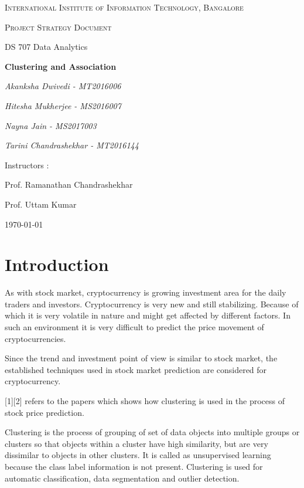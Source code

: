 \documentclass{article}
\begin{document}
\begin{titlepage}
	\centering
	{\scshape\LARGE International Institute of Information Technology, Bangalore \par}
	\vspace{1cm}
	{\scshape\Large Project Strategy Document\par}
	{\Large  DS 707 Data Analytics\par}
	\vspace{1.5cm}
	{\huge\bfseries Clustering and Association \par}
	\vspace{2cm}
	{\Large\itshape Akanksha Dwivedi - MT2016006\par}
	{\Large\itshape Hitesha Mukherjee - MS2016007\par}
	{\Large\itshape Nayna Jain - MS2017003\par}
	{\Large\itshape Tarini Chandrashekhar - MT2016144\par}
	\vfill
	Instructors : \par
	Prof. Ramanathan Chandrashekhar
	\par
	Prof. Uttam Kumar

	\vfill
	{\large \today\par}
\end{titlepage}

\newpage

\section{Introduction}
As with stock market, cryptocurrency is growing investment area for the daily traders and investors. Cryptocurrency is very new and still stabilizing. Because of which it is very volatile in nature and might get affected by different factors. In such an environment it is very difficult to predict the price movement of cryptocurrencies.

Since the trend and investment point of view is similar to stock market, the established techniques used in stock market prediction are considered for cryptocurrency.

[1][2] refers to the papers which shows how clustering is used in the process of stock price prediction.

Clustering is the process of grouping of set of data objects into multiple groups or clusters so that objects within a cluster have high similarity, but are very dissimilar to objects in other clusters. It is called as unsupervised learning because the class label information is not present. Clustering is used for automatic classification, data segmentation and outlier detection.
\end{document}
